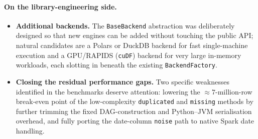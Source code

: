\documentclass[../main.tex]{subfiles}
\begin{document}
\paragraph{On the library-engineering side.}
\begin{itemize}
    \item \textbf{Additional backends.} The \texttt{BaseBackend} abstraction was deliberately designed so that new engines can be added without touching the public API; natural candidates are a Polars or DuckDB backend for fast single-machine execution and a GPU/RAPIDS (\texttt{cuDF}) backend for very large in-memory workloads, each slotting in beneath the existing \texttt{BackendFactory}.
    
    \item \textbf{Closing the residual performance gaps.} Two specific weaknesses identified in the benchmarks deserve attention: lowering the $\approx 7$-million-row break-even point of the low-complexity \texttt{duplicated} and \texttt{missing} methods by further trimming the fixed DAG-construction and Python--JVM serialisation overhead, and fully porting the date-column \texttt{noise} path to native Spark date handling.

\end{itemize}
\end{document}
